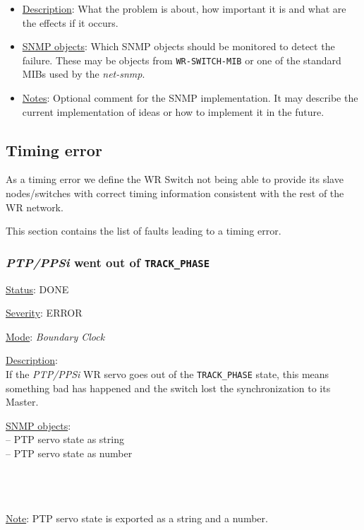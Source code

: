 \begin{itemize}[leftmargin=0pt]
	\item [] \underline{Description}: What the problem is about, how important it
		is and what are the effects if it occurs.
	\item [] \underline{SNMP objects}: Which SNMP objects should be monitored to
		detect the failure. These may be objects from \texttt{WR-SWITCH-MIB} or one
		of the standard MIBs used by the \emph{net-snmp}.
	\item [] \underline{Notes}: Optional comment for the SNMP implementation. It
    may describe the current implementation of ideas or how to implement it in
    the future.
\end{itemize}

\subsection{Timing error}
\label{sec:timing_fail}
As a timing error we define the WR Switch not being able to provide its slave
nodes/switches with correct timing information consistent with the rest of the
WR network.

\noindent This section contains the list of faults leading to a timing error.

\subsubsection{\bf \emph{PTP/PPSi} went out of \texttt{TRACK\_PHASE}}
		\label{fail:timing:ppsi_track_phase}
    \begin{pck_descr}
			\item [] \underline{Status}: DONE
			\item [] \underline{Severity}: ERROR
			\item [] \underline{Mode}: \emph{Boundary Clock}
			\item [] \underline{Description}:\\
				If the \emph{PTP/PPSi} WR servo goes out of the \texttt{TRACK\_PHASE}
				state, this means something bad has happened and the switch lost the
				synchronization to its Master.
			\item [] \underline{SNMP objects}:\\
        {\footnotesize
				 -- PTP servo state as string\\
				 -- PTP servo state as number\\
				\\
				 \\
				 \\
         }

			\item [] \underline{Note}: PTP servo state is exported as a string and a number.
		\end{pck_descr}

